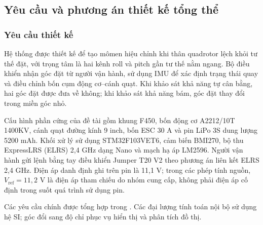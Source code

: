 \subsection{Yêu cầu và phương án thiết kế tổng thể}
\label{sec:design-requirements}

\subsubsection{Yêu cầu thiết kế}

Hệ thống được thiết kế để tạo mômen hiệu chỉnh khi thân quadrotor lệch khỏi tư thế đặt, với trọng tâm là hai kênh roll và pitch gần tư thế nằm ngang. Bộ điều khiển nhận góc đặt từ người vận hành, sử dụng IMU để xác định trạng thái quay và điều chỉnh bốn cụm động cơ--cánh quạt. Khi khảo sát khả năng tự cân bằng, hai góc đặt được đưa về không; khi khảo sát khả năng bám, góc đặt thay đổi trong miền góc nhỏ.

Cấu hình phần cứng của đề tài gồm khung F450, bốn động cơ A2212/10T 1400KV, cánh quạt đường kính 9 inch, bốn ESC 30 A và pin LiPo 3S dung lượng 5200 mAh. Khối xử lý sử dụng STM32F103VET6, cảm biến BMI270, bộ thu ExpressLRS (ELRS) 2,4 GHz dạng Nano và mạch hạ áp LM2596. Người vận hành gửi lệnh bằng tay điều khiển Jumper T20 V2 theo phương án liên kết ELRS 2,4 GHz. Điện áp danh định ghi trên pin là 11,1 V; trong các phép tính nguồn, $V_{\mathrm{ref}}=11{,}2$ V là điện áp tham chiếu do nhóm cung cấp, không phải điện áp cố định trong suốt quá trình sử dụng pin.

Các yêu cầu chính được tổng hợp trong . Các đại lượng tính toán nội bộ sử dụng hệ SI; góc đổi sang độ chỉ phục vụ hiển thị và phân tích đồ thị.


